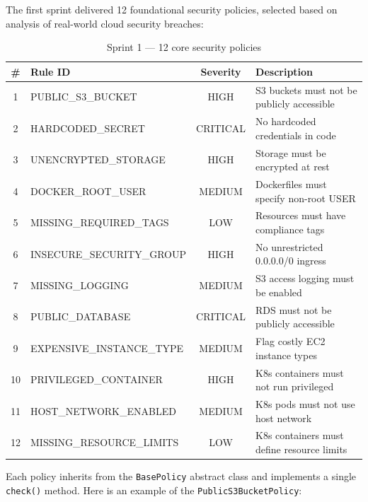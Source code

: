 The first sprint delivered 12 foundational security policies, selected based on analysis of real-world cloud security breaches:

\begin{table}[H]
\centering
\caption{Sprint 1 — 12 core security policies}
\label{tab:sprint1-policies}
\small
\begin{tabular}{|c|p{4cm}|c|p{5cm}|}
\hline
\textbf{\#} & \textbf{Rule ID} & \textbf{Severity} & \textbf{Description} \\
\hline
1 & PUBLIC\_S3\_BUCKET & HIGH & S3 buckets must not be publicly accessible \\
\hline
2 & HARDCODED\_SECRET & CRITICAL & No hardcoded credentials in code \\
\hline
3 & UNENCRYPTED\_STORAGE & HIGH & Storage must be encrypted at rest \\
\hline
4 & DOCKER\_ROOT\_USER & MEDIUM & Dockerfiles must specify non-root USER \\
\hline
5 & MISSING\_REQUIRED\_TAGS & LOW & Resources must have compliance tags \\
\hline
6 & INSECURE\_SECURITY\_GROUP & HIGH & No unrestricted 0.0.0.0/0 ingress \\
\hline
7 & MISSING\_LOGGING & MEDIUM & S3 access logging must be enabled \\
\hline
8 & PUBLIC\_DATABASE & CRITICAL & RDS must not be publicly accessible \\
\hline
9 & EXPENSIVE\_INSTANCE\_TYPE & MEDIUM & Flag costly EC2 instance types \\
\hline
10 & PRIVILEGED\_CONTAINER & HIGH & K8s containers must not run privileged \\
\hline
11 & HOST\_NETWORK\_ENABLED & MEDIUM & K8s pods must not use host network \\
\hline
12 & MISSING\_RESOURCE\_LIMITS & LOW & K8s containers must define resource limits \\
\hline
\end{tabular}
\end{table}

Each policy inherits from the \texttt{BasePolicy} abstract class and implements a single \texttt{check()} method. Here is an example of the \texttt{PublicS3BucketPolicy}:

